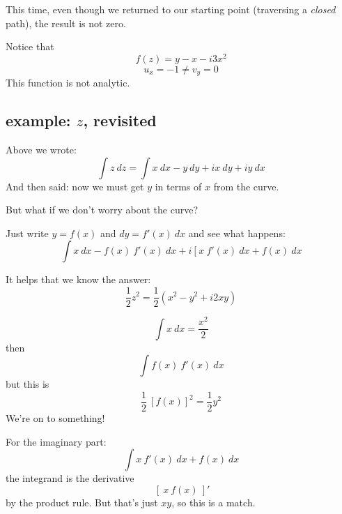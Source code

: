\documentclass[11pt, oneside]{article}
\begin{document}
This time, even though we returned to our starting point (traversing a \emph{closed} path), the result is not zero.

Notice that
\[ f(z) = y - x - i3x^2 \]
\[ u_x = -1 \ne v_y = 0 \]
This function is not analytic.

\subsection*{example: $z$, revisited}
Above we wrote:
\[ \int z \ dz = \int x \ dx - y \ dy + i x \ dy + i y \ dx \]
And then said:  now we must get $y$ in terms of $x$ from the curve.

But what if we don't worry about the curve?  

Just write $y = f(x)$ and $dy = f'(x) \ dx$ and see what happens:
\[ \int x \ dx - f(x) \ f'(x) \ dx + i \ [ \ x \  f'(x) \ dx + f(x) \ dx \]

It helps that we know the answer:
\[ \frac{1}{2} z^2 = \frac{1}{2} (x^2 - y^2 + i 2xy) \]

\[ \int x \ dx = \frac{x^2}{2} \]
then
\[ \int f(x) \ f'(x) \ dx \]
but this is
\[ \frac{1}{2} \ [f(x)]^2 = \frac{1}{2} y^2 \]
We're on to something!

For the imaginary part:
\[ \int x \  f'(x) \ dx + f(x) \ dx \]
the integrand is the derivative
\[ \ [ \ x \ f(x) \ ]' \]
by the product rule.  But that's just $xy$, so this is a match. 
\end{document}
